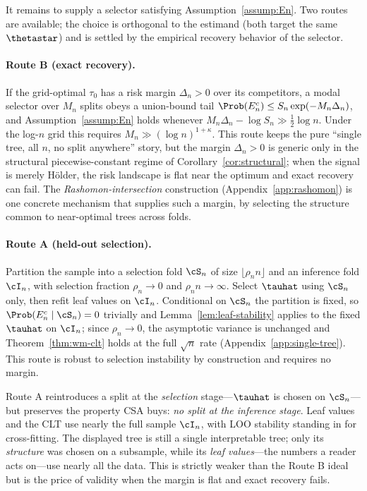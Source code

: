It remains to supply a selector satisfying Assumption~\ref{assump:En}. Two routes are
available; the choice is orthogonal to the estimand (both target the same
$\thetastar$) and is settled by the empirical recovery behavior of the selector.

\paragraph{Route B (exact recovery).}
If the grid-optimal $\tau_0$ has a risk margin $\Delta_n > 0$ over its competitors, a
modal selector over $M_n$ splits obeys a union-bound tail
$\Prob(E_n^c) \le S_n \exp(-M_n \Delta_n)$, and Assumption~\ref{assump:En} holds
whenever $M_n \Delta_n - \log S_n \gg \tfrac12 \log n$. Under the log-$n$ grid this
requires $M_n \gg (\log n)^{1 + \kappa}$. This route keeps the pure ``single tree, all
$n$, no split anywhere'' story, but the margin $\Delta_n > 0$ is generic only in the
structural piecewise-constant regime of Corollary~\ref{cor:structural}; when the signal
is merely H\"older, the risk landscape is flat near the optimum and exact recovery can
fail. The \emph{Rashomon-intersection} construction (Appendix~\ref{app:rashomon}) is
one concrete mechanism that supplies such a margin, by selecting the structure common
to near-optimal trees across folds.

\paragraph{Route A (held-out selection).}
Partition the sample into a selection fold $\cS_n$ of size $\lfloor \rho_n n \rfloor$
and an inference fold $\cI_n$, with selection fraction $\rho_n \to 0$ and
$\rho_n n \to \infty$. Select $\tauhat$ using $\cS_n$ only, then refit leaf values on
$\cI_n$. Conditional on $\cS_n$ the partition is fixed, so
$\Prob(E_n^c \mid \cS_n) = 0$ trivially and Lemma~\ref{lem:leaf-stability} applies to
the fixed $\tauhat$ on $\cI_n$; since $\rho_n \to 0$, the asymptotic variance is
unchanged and Theorem~\ref{thm:wm-clt} holds at the full $\sqrt{n}$ rate
(Appendix~\ref{app:single-tree}). This route is robust to selection instability by
construction and requires no margin.

\begin{remark}
\label{rem:route-a-scope}
Route A reintroduces a split at the \emph{selection} stage---$\tauhat$ is chosen on
$\cS_n$---but preserves the property CSA buys: \emph{no split at the inference stage}.
Leaf values and the CLT use nearly the full sample $\cI_n$, with LOO stability standing
in for cross-fitting. The displayed tree is still a single interpretable tree; only its
\emph{structure} was chosen on a subsample, while its \emph{leaf values}---the numbers a
reader acts on---use nearly all the data. This is strictly weaker than the Route B ideal
but is the price of validity when the margin is flat and exact recovery fails.
\end{remark}

